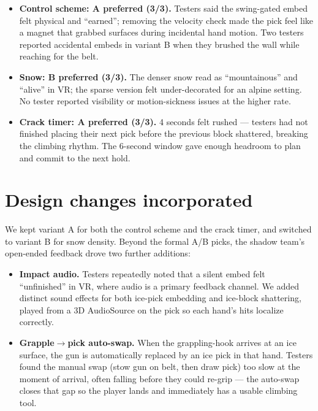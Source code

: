 \documentclass[11pt]{article}
\begin{document}
\begin{itemize}
    \item \textbf{Control scheme: A preferred (3/3).} Testers said the swing-gated embed felt physical and ``earned''; removing the velocity check made the pick feel like a magnet that grabbed surfaces during incidental hand motion. Two testers reported accidental embeds in variant B when they brushed the wall while reaching for the belt.
    \item \textbf{Snow: B preferred (3/3).} The denser snow read as ``mountainous'' and ``alive'' in VR; the sparse version felt under-decorated for an alpine setting. No tester reported visibility or motion-sickness issues at the higher rate.
    \item \textbf{Crack timer: A preferred (3/3).} 4 seconds felt rushed --- testers had not finished placing their next pick before the previous block shattered, breaking the climbing rhythm. The 6-second window gave enough headroom to plan and commit to the next hold.
\end{itemize}

\section*{Design changes incorporated}

We kept variant A for both the control scheme and the crack timer, and switched to variant B for snow density. Beyond the formal A/B picks, the shadow team's open-ended feedback drove two further additions:

\begin{itemize}
    \item \textbf{Impact audio.} Testers repeatedly noted that a silent embed felt ``unfinished'' in VR, where audio is a primary feedback channel. We added distinct sound effects for both ice-pick embedding and ice-block shattering, played from a 3D AudioSource on the pick so each hand's hits localize correctly.
    \item \textbf{Grapple$\rightarrow$pick auto-swap.} When the grappling-hook arrives at an ice surface, the gun is automatically replaced by an ice pick in that hand. Testers found the manual swap (stow gun on belt, then draw pick) too slow at the moment of arrival, often falling before they could re-grip --- the auto-swap closes that gap so the player lands and immediately has a usable climbing tool.
\end{itemize}
\end{document}
